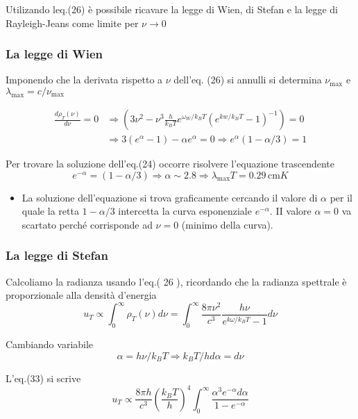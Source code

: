 \documentclass[11pt]{article}
\providecommand{\tightlist}{%
      \setlength{\itemsep}{0pt}\setlength{\parskip}{0pt}}
\begin{document}
Utilizando leq.(26) è possibile ricavare la legge di Wien, di Stefan e
la legge di Rayleigh-Jeans come limite per \(\nu \rightarrow 0\)

\hypertarget{la-legge-di-wien}{%
\subsubsection{La legge di Wien}\label{la-legge-di-wien}}

Imponendo che la derivata rispetto a $ \nu$ dell'eq. (26) si annulli
si determina $\nu_{\max }$ e $\lambda_{\max }=c / \nu_{\max }$

\[
\begin{aligned}
\frac{d \rho_{T}(\nu)}{d \nu}=0 & \Rightarrow\left(3 \nu^{2}-\nu^{3} \frac{h}{k_{B} T} e^{\omega_{W} / k_{B} T}\left(e^{k w / k_{B} T}-1\right)^{-1}\right)=0 \\
& \Rightarrow 3\left(e^{\alpha}-1\right)-\alpha e^{\alpha}=0 \Rightarrow e^{\alpha}(1-\alpha / 3)=1
\end{aligned}
\]

Per trovare la soluzione dell'eq.(24) occorre risolvere l'equazione
trascendente \[
e^{-\alpha}=(1-\alpha / 3) \Rightarrow \alpha \sim 2.8 \Rightarrow \lambda_{\max } T=0.29\, \mathrm{cm} K
\]

\begin{itemize}
\tightlist
\item
  La soluzione dell'equazione si trova graficamente cercando il valore
  di \(\alpha\) per il quale la retta \(1-\alpha / 3\) intercetta la
  curva esponenziale \(e^{-\alpha} .\) II valore \(\alpha=0\) va
  scartato perché corrisponde ad \(\nu=0\) (minimo della curva).
\end{itemize}

    

    \hypertarget{la-legge-di-stefan}{%
\subsubsection{La legge di Stefan}\label{la-legge-di-stefan}}

Calcoliamo la radianza usando l'eq.( 26 ), ricordando che la radianza
spettrale è proporzionale alla densità d'energia \[
u_{T} \propto \int_{0}^{\infty} \rho_{T}(\nu) d \nu=\int_{0}^{\infty} \frac{8 \pi \nu^{2}}{c^{3}} \frac{h \nu}{e^{k \omega / k_{B} T}-1} d \nu
\]

Cambiando variabile
\[\alpha=h \nu / k_{B} T \Rightarrow k_{B} T / h d \alpha=d \nu\]

L'eq.(33) si scrive \[
u_{T} \propto \frac{8 \pi h}{c^{3}}\left(\frac{k_{B} T}{h}\right)^{4} \int_{0}^{\infty} \frac{\alpha^{3} e^{-\alpha} d \alpha}{1-e^{-\alpha}}
\]
\end{document}
